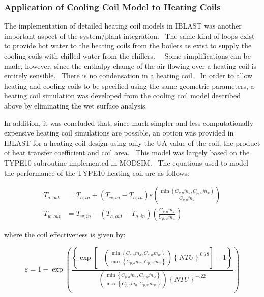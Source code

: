 \subsubsection{Application of Cooling Coil Model to Heating Coils}\label{application-of-cooling-coil-model-to-heating-coils}

The implementation of detailed heating coil models in IBLAST was another important aspect of the system/plant integration.~ The same kind of loops exist to provide hot water to the heating coils from the boilers as exist to supply the cooling coils with chilled water from the chillers.~~ Some simplifications can be made, however, since the enthalpy change of the air flowing over a heating coil is entirely sensible.~ There is no condensation in a heating coil.~ In order to allow heating and cooling coils to be specified using the same geometric parameters, a heating coil simulation was developed from the cooling coil model described above by eliminating the wet surface analysis.

In addition, it was concluded that, since much simpler and less computationally expensive heating coil simulations are possible, an option was provided in IBLAST for a heating coil design using only the UA value of the coil, the product of heat transfer coefficient and coil area.~ This model was largely based on the TYPE10 subroutine implemented in MODSIM.~ The equations used to model the performance of the TYPE10 heating coil are as follows:

\begin{equation}
  \begin{array}{rl}
    T_{a,out} & = T_{a,in} + \left( T_{w,in} - T_{a,in} \right) \varepsilon \left( \frac{\min \left( C_{p,a} \dot m_a,C_{p,w}\dot m_w \right)} {C_{p,a}\dot m_a} \right) \\
    T_{w,out} & = T_{w,in} - \left( T_{a,out} - T_{a,in} \right) \left( \frac{C_{p,a}\dot m_a}{C_{p,w}\dot m_w} \right)
  \end{array}
\end{equation}

where the coil effectiveness is given by:

\begin{equation}
\varepsilon  = 1 - \exp \left( {\frac{{\left\{ {\exp \left[ { - \left( {\frac{{\min \left\{ {{C_{p,a}}{{\dot m}_a},{C_{p,w}}{{\dot m}_w}} \right\}}}{{\max \left\{ {{C_{p,a}}{{\dot m}_a},{C_{p,w}}{{\dot m}_w}} \right\}}}} \right){{\left\{ {NTU} \right\}}^{0.78}}} \right] - 1} \right\}}}{{\left( {\frac{{\min \left\{ {{C_{p,a}}{{\dot m}_a},{C_{p,w}}{{\dot m}_w}} \right\}}}{{\max \left\{ {{C_{p,a}}{{\dot m}_a},{C_{p,w}}{{\dot m}_w}} \right\}}}} \right){{\left\{ {NTU} \right\}}^{ - .22}}}}} \right)
\end{equation}

